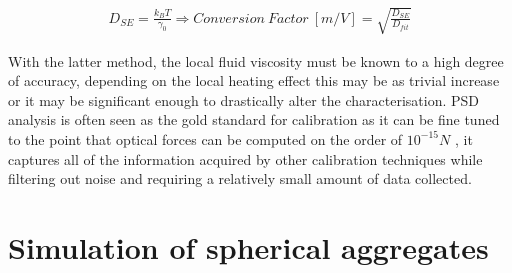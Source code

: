 \begin{align}
	\label{eq:correction_factor}
	D_{SE} = \frac{k_BT}{\gamma_0} \Rightarrow Conversion\ Factor \ [m/V]= \sqrt{\frac{D_{SE}}{D_{fit}}}
\end{align}

With the latter method, the local fluid viscosity must be known to a high degree of accuracy, depending on the local heating effect this may be as trivial increase or it may be significant enough to drastically alter the characterisation. PSD analysis is often seen as the gold standard for calibration as it can be fine tuned to the point that optical forces can be computed on the order of $10^{-15} N$ \cite{BergSoerensen2004}, it captures all of the information acquired by other calibration techniques while filtering out noise and requiring a relatively small amount of data collected. 


\section{Simulation of spherical aggregates}

